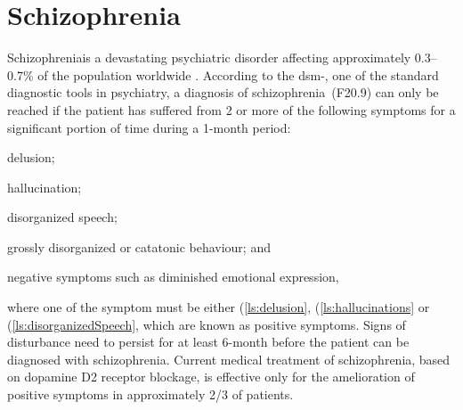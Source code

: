 \documentclass[12pt]{scrbook}
\newcommand{\rom}[1]{\uppercase\expandafter{\romannumeral #1\relax}}
\newcommand*{\scz}{schizophrenia}
\newcommand*{\Scz}{Schizophrenia}
\begin{document}
\section{\Scz}
\Scz is a devastating psychiatric disorder affecting approximately 0.3--0.7\% of the population worldwide \citep{AmericanPsychiatricAssociation2013}.
According to the \gls{dsm}-\rom{5}, one of the standard diagnostic tools in psychiatry, a diagnosis of \scz\ (F20.9) can only be reached if the patient has suffered from 2 or more of the following symptoms for a significant portion of time during a 1-month period: 
\begin{enumerate*}[label=\arabic*\upshape)]
	\item delusion; \label{ls:delusion}
	\item hallucination;\label{ls:hallucinations}
	\item disorganized speech;\label{ls:disorganizedSpeech}
	\item grossly disorganized or catatonic behaviour; and\label{ls:catatonicBehavior}
	\item negative symptoms such as diminished emotional expression,\label{ls:negativeSymptoms}
\end{enumerate*}  where one of the symptom must be either (\ref{ls:delusion}, (\ref{ls:hallucinations} or (\ref{ls:disorganizedSpeech}, which are known as positive symptoms.
Signs of disturbance need to persist for at least 6-month before the patient can be diagnosed with \scz.
Current medical treatment of \scz, based on dopamine D2 receptor blockage, is effective only for the amelioration of positive symptoms in approximately 2/3 of patients.
\end{document}
